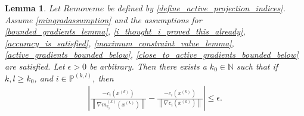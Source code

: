 \documentclass{article}
\newtheorem{lemma}[theorem]{Lemma}
\theoremstyle{case}
\numberwithin{theorem}{subsection}
\newcommand{\gmcik}{{\nabla m_{c_i}^{(k)}\left(\xk\right)}}
\newcommand{\naturals}{\mathbb N}
\newcommand{\xk}{x^{(k)}}
\newcommand{\activeprojkl}{{\mathbb P^{(k, l)}}}
\newcommand{\activeprojk}{{Remove me}}
\begin{document}
\begin{lemma}
\label{ziks_are_close_lemma}
Let $\activeprojk$ be defined by \cref{define_active_projection_indices}.
Assume 
\cref{mingradassumption} and the assumptions for
\cref{bounded_gradients_lemma},
\cref{i_thought_i_proved_this_already},
\cref{accuracy_is_satisfied},
\cref{maximum_constraint_value_lemma},
\cref{active_gradients_bounded_below},
\cref{close_to_active_gradients_bounded_below}
are satisfied.
Let $\epsilon > 0$ be arbitrary.
Then there exists a $k_0 \in \naturals$ such that if $k, l \ge k_0$, and $i \in \activeprojkl$,
then 
\begin{align*}
\left|\frac{-c_i\left(\xk \right)}{\left\|\gmcik\right\|} - \frac{-c_i\left(\xk \right)}{\left\|\nabla c_i\left(\xk \right)\right\|} \right| \le \epsilon.
\end{align*}
\end{lemma}
\end{document}
